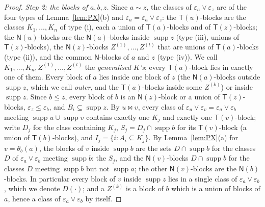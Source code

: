\documentclass[11pt]{amsart}
\theoremstyle{definition}
\newcommand{\supp}{\operatorname{supp}}
\newcommand{\T}{\mathsf{T}}
\newcommand{\N}{\mathsf{N}}
\newcommand{\mt}{\bowtie}      %
\begin{document}
\begin{proof}
\smallskip\emph{Step 2: the blocks of $a,b,z$.} Since $a\sim z$, the classes of $\varepsilon_a\vee\varepsilon_z$ are of the four types of Lemma~\ref{lem:PX}(b) and $\varepsilon_u=\varepsilon_a\vee\varepsilon_z$: the $\T(u)$-blocks are the classes $K_1,\dots,K_n$ of type (i), each a union of $\T(a)$-blocks and of $\T(z)$-blocks; the $\N(u)$-blocks are the $\N(a)$-blocks inside $\supp z$ (type (iii), unions of $\T(z)$-blocks), the $\N(z)$-blocks $Z^{(1)},\dots,Z^{(t)}$ that are unions of $\T(a)$-blocks (type (ii)), and the common $\N$-blocks of $a$ and $z$ (type (iv)). We call $K_1,\dots,K_n,Z^{(1)},\dots,Z^{(t)}$ the \emph{generalised $K$'s}; every $\T(a)$-block lies in exactly one of them. Every block of $a$ lies inside one block of $z$ (the $\N(a)$-blocks outside $\supp z$, which we call \emph{outer}, and the $\T(a)$-blocks inside some $Z^{(k)}$) or inside $\supp z$. Since $b\le z$, every block of $b$ is an $\N(z)$-block or a union of $\T(z)$-blocks, $\varepsilon_z\le\varepsilon_b$, and $B_i\subseteq\supp z$. By $u\mt v$, every class of $\varepsilon_u\vee\varepsilon_v=\varepsilon_a\vee\varepsilon_b$ meeting $\supp u\cup\supp v$ contains exactly one $K_j$ and exactly one $\T(v)$-block; write $D_j$ for the class containing $K_j$, $S_j=D_j\cap\supp b$ for its $\T(v)$-block (a union of $\T(b)$-blocks), and $I_j=\{i:A_i\subseteq K_j\}$. By Lemma~\ref{lem:PX}(a) for $v=\theta_b(a)$, the blocks of $v$ inside $\supp b$ are the sets $D\cap\supp b$ for the classes $D$ of $\varepsilon_a\vee\varepsilon_b$ meeting $\supp b$: the $S_j$, and the $\N(v)$-blocks $D\cap\supp b$ for the classes $D$ meeting $\supp b$ but not $\supp a$; the other $\N(v)$-blocks are the $\N(b)$-blocks. In particular every block of $v$ inside $\supp z$ lies in a single class of $\varepsilon_a\vee\varepsilon_b$, which we denote $D(\cdot)$; and a $Z^{(k)}$ is a block of $b$ which is a union of blocks of $a$, hence a class of $\varepsilon_a\vee\varepsilon_b$ by itself.


\end{proof}
\end{document}
